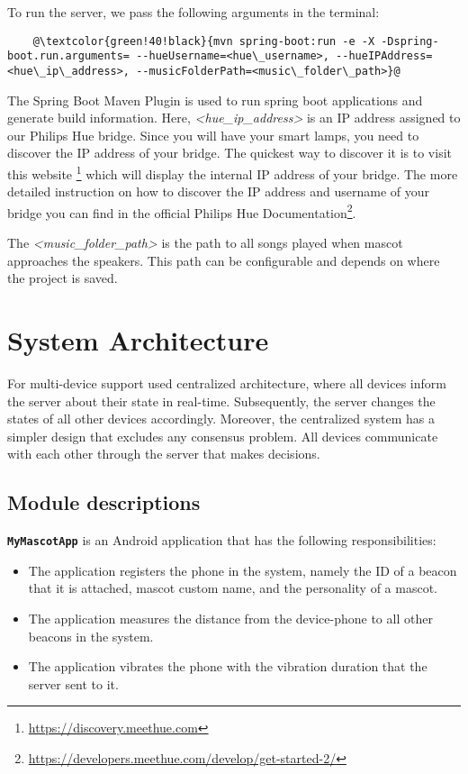 To run the server, we pass the following arguments in the terminal:
\begin{lstlisting}
    @\textcolor{green!40!black}{mvn spring-boot:run -e -X -Dspring-boot.run.arguments= --hueUsername=<hue\_username>, --hueIPAddress=<hue\_ip\_address>, --musicFolderPath=<music\_folder\_path>}@
\end{lstlisting}

The Spring Boot Maven Plugin is used to run spring boot applications and generate build information.
Here, \emph{<hue\_ip\_address>} is an IP address assigned to our Philips Hue bridge.
Since you will have your smart lamps, you need to discover the IP address of your bridge.
The quickest way to discover it is to visit this website \footnote{\url{https://discovery.meethue.com}} which
will display the internal IP address of your bridge.
The more detailed instruction on how to discover the IP address and username of your bridge you can
find in the official Philips Hue Documentation\footnote{\url{https://developers.meethue.com/develop/get-started-2/}}.

The \emph{<music\_folder\_path>} is the path to all songs played when mascot approaches the speakers.
This path can be configurable and depends on where the project is saved.

\section{System Architecture}
\label{sec:system-architecture}
For multi-device support used centralized architecture, where all devices inform the server about their state in real-time.
Subsequently, the server changes the states of all other devices accordingly.
Moreover, the centralized system has a simpler design that excludes any consensus problem.
All devices communicate with each other through the server that makes decisions.

\subsection{Module descriptions}
\label{subsec:module-descriptions}
\textbf{\texttt{MyMascotApp}} is an Android application that has the following responsibilities:
\begin{itemize}
    \item The application registers the phone in the system, namely the ID of a beacon that it is attached,
    mascot custom name, and the personality of a mascot.
    \item The application measures the distance from the device-phone to all other beacons in the system.
    \item The application vibrates the phone with the vibration duration that the server sent to it.
\end{itemize}

